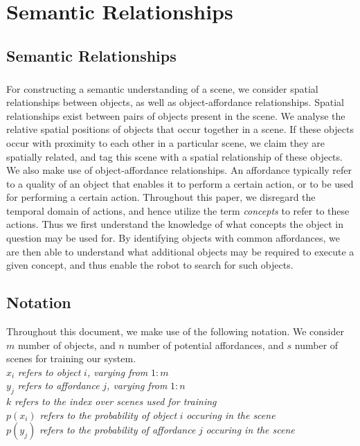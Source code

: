 \chapter{Semantic Relationships}



\section{Semantic Relationships}
\paragraph{}

For constructing a semantic understanding of a scene, we consider spatial relationships between objects, as well as object-affordance relationships. Spatial relationships exist between pairs of objects present in the scene. We analyse the relative spatial positions of objects that occur together in a scene. If these objects occur with proximity to each other in a particular scene, we claim they are spatially related, and tag this scene with a spatial relationship of these objects. 
We also make use of object-affordance relationships. An affordance typically refer to a quality of an object that enables it to perform a certain action, or to be used for performing a certain action. Throughout this paper, we disregard the temporal domain of actions, and hence utilize the term \textit{concepts} to refer to these actions. Thus we first understand the knowledge of what concepts the object in question may be used for. By identifying objects with common affordances, we are then able to understand what additional objects may be required to execute a given concept, and thus enable the robot to search for such objects. 

\section{Notation}
Throughout this document, we make use of the following notation. We consider $m$ number of objects, and $n$ number of potential affordances, and $s$ number of scenes for training our system. \\
\hspace*{10pt} $x_i$ \textit{refers to object} $i$\textit{, varying from} $1:m$\\
\hspace*{10pt} $y_j$ \textit{refers to affordance} $j$\textit{, varying from} $1:n$\\
\hspace*{10pt} $k$ \textit{refers to the index over scenes used for training}\\
\hspace*{10pt} $p(x_i)$ \textit{refers to the probability of object} $i$ \textit{occuring in the scene}\\
\hspace*{10pt} $p(y_j)$ \textit{refers to the probability of affordance} $j$ \textit{occuring in the scene}

